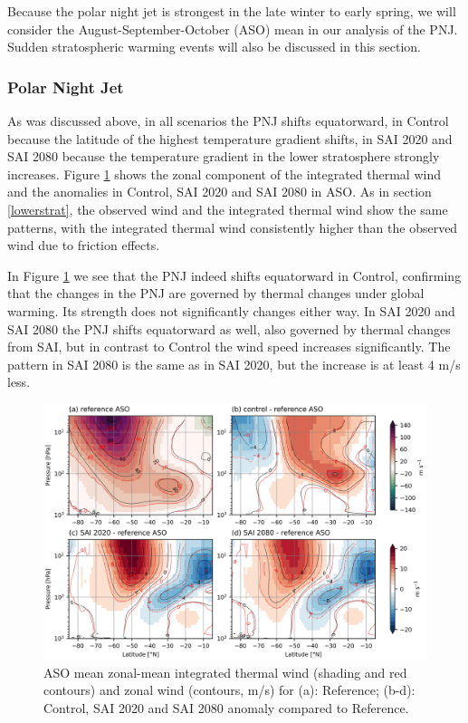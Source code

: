 Because the polar night jet is strongest in the late winter to early spring, we will consider the August-September-October (ASO) mean in our analysis of the PNJ. Sudden stratospheric warming events will also be discussed in this section. 

\subsubsection{Polar Night Jet}
As was discussed above, in all scenarios the PNJ shifts equatorward, in Control because the latitude of the highest temperature gradient shifts, in SAI 2020 and SAI 2080 because the temperature gradient in the lower stratosphere strongly increases. Figure \ref{fig:PNJ_UT_U_zmdiff} shows the zonal component of the integrated thermal wind and the anomalies in Control, SAI 2020 and SAI 2080 in ASO. As in section \ref{lowerstrat}, the observed wind and the integrated thermal wind show the same patterns, with the integrated thermal wind consistently higher than the observed wind due to friction effects. 

In Figure \ref{fig:PNJ_UT_U_zmdiff} we see that the PNJ indeed shifts equatorward in Control, confirming that the changes in the PNJ are governed by thermal changes under global warming. Its strength does not significantly changes either way. In SAI 2020 and SAI 2080 the PNJ shifts equatorward as well, also governed by thermal changes from SAI, but in contrast to Control the wind speed increases significantly. The pattern in SAI 2080 is the same as in SAI 2020, but the increase is at least 4 m/s less.

\begin{figure}[H]
	\centering
	\includegraphics[width=0.95\linewidth]{images/PNJ_UT_U_zmdiff.png}
	\caption{ASO mean zonal-mean integrated thermal wind (shading and red contours) and zonal wind (contours, m/s) for (a): Reference; (b-d): Control, SAI 2020 and SAI 2080 anomaly compared to Reference.}
	\label{fig:PNJ_UT_U_zmdiff}
\end{figure}

